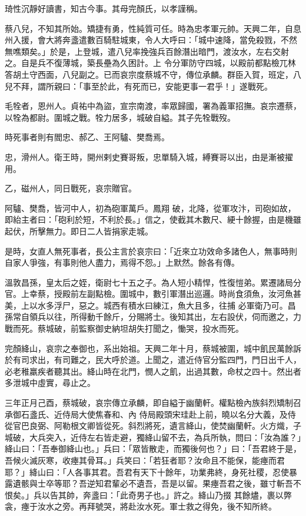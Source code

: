 \begin{pinyinscope}
 琦性沉靜好讀書，知古今事。其母完顏氏，以孝謹稱。



 蔡八兒，不知其所始。矯捷有勇，性純質可任。時為忠孝軍元帥。天興二年，自息州入援，會大將奔盞遣數百騎駐城東，令人大呼曰：「城中速降，當免殺戮，不然無噍類矣。」於是，上登城，遣八兒率挽強兵百餘潛出暗門，渡汝水，左右交射之。自是兵不復薄城，築長壘為久困計。上
 令分軍防守四城，以殿前都點檢兀林答胡土守西面，八兒副之。已而哀宗度蔡城不守，傳位承麟。群臣入賀，班定，八兒不拜，謂所親曰：「事至於此，有死而已，安能更事一君乎！」遂戰死。



 毛牷者，恩州人。貞祐中為盜，宣宗南渡，率眾歸國，署為義軍招撫。哀宗遷蔡，以牷為都尉。圍城之戰。牷力居多，城破自縊。其子先牷戰歿。



 時死事者則有閻忠、郝乙、王阿驢、樊喬焉。



 忠，滑州人。衛王時，開州剌史賽哥叛，忠單騎入城，縛賽哥以出，由是漸被擢用。



 乙，磁州人，同日戰死，哀宗贈官。



 阿驢、樊喬，皆河中人，初為砲軍萬戶。鳳翔
 破，北降，從軍攻汴，司砲如故，即紿主者曰：「砲利於短，不利於長。」信之，使截其木數尺、綆十餘握，由是機雖起伏，所擊無力。即日二人皆捐家走城。



 是時，女直人無死事者，長公主言於哀宗曰：「近來立功效命多諸色人，無事時則自家人爭強，有事則他人盡力，焉得不怨。」上默然。餘各有傳。



 溫敦昌孫，皇太后之姪，衛尉七十五之子。為人短小精悍，性復愷弟。累遷諸局分官。上幸蔡，授殿前左副點檢。圍城中，數引軍潛出巡邏。時尚食須魚，汝河魚甚美，上以水多浮尸，惡之。城西有積水曰練江，魚大且多，往捕
 必軍衛乃可。昌孫常自領兵以往，所得動千餘斤，分賜將士。後知其出，左右設伏，伺而邀之，力戰而死。蔡城破，前監察御史納坦胡失打聞之，慟哭，投水而死。



 完顏絳山，哀宗之奉御也，系出始祖。天興二年十月，蔡城被圍，城中飢民萬餘訴於有司求出，有司難之，民大呼於道。上聞之，遣近侍官分監四門，門日出千人，必老稚羸疾者聽其出。絳山時在北門，憫人之飢，出過其數，命杖之四十。然出者多泄城中虛實，尋止之。



 三年正月己酉，蔡城破，哀宗傳立承麟，即自縊于幽蘭軒。權點檢內族斜烈矯制召承御石盞氏、近侍局大使焦春和、內
 侍局殿頭宋珪赴上前，曉以名分大義，及侍從官巴良弼、阿勒根文卿皆從死。斜烈將死，遺言絳山，使焚幽蘭軒。火方熾，子城破，大兵突入，近侍左右皆走避，獨絳山留不去，為兵所執，問曰：「汝為誰？」絳山曰：「吾奉御絳山也。」兵曰：「眾皆散走，而獨後何也？」曰：「吾君終于是，吾候火滅灰寒，收瘞其骨耳。」兵笑曰：「若狂者耶？汝命且不能保，能瘞而君耶？」絳山曰：「人各事其君。吾君有天下十餘年，功業弗終，身死社稷，忍使暴露遺骸與士卒等耶？吾逆知君輩必不遺吾，吾是以留。果瘞吾君之後，雖寸斬吾不恨矣。」兵以告其帥，奔盞曰：「此奇男子也。」許之。絳山乃掇
 其餘燼，裹以弊衾，瘞于汝水之旁。再拜號哭，將赴汝水死。軍士救之得免，後不知所終。




\end{pinyinscope}
